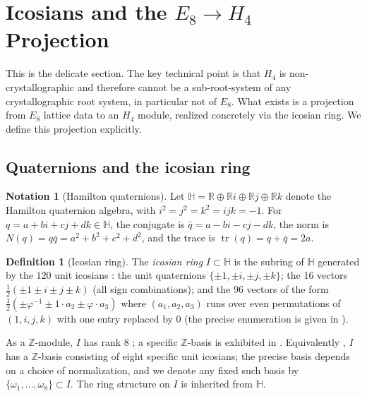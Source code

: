 \documentclass[11pt, a4paper]{amsart}
\theoremstyle{definition}
\newtheorem{definition}[theorem]{Definition}
\newtheorem{notation}[theorem]{Notation}
\newcommand{\R}{\mathbb{R}}
\newcommand{\Z}{\mathbb{Z}}
\newcommand{\HH}{\mathbb{H}}
\begin{document}
\section{Icosians and the $E_8 \to H_4$ Projection}
\label{sec:H4}

This is the delicate section. The key technical point is that
$H_4$ is non-crystallographic and therefore cannot be a
sub-root-system of any crystallographic root system, in particular
not of $E_8$. What exists is a projection from $E_8$ lattice data
to an $H_4$ module, realized concretely via the icosian ring. We
define this projection explicitly.

\subsection{Quaternions and the icosian ring}

\begin{notation}[Hamilton quaternions]
Let $\HH = \R \oplus \R i \oplus \R j \oplus \R k$ denote the
Hamilton quaternion algebra, with $i^2 = j^2 = k^2 = ijk = -1$.
For $q = a + bi + cj + dk \in \HH$, the conjugate is
$\bar q = a - bi - cj - dk$, the norm is
$N(q) = q \bar q = a^2 + b^2 + c^2 + d^2$, and the trace is
$\operatorname{tr}(q) = q + \bar q = 2a$.
\end{notation}

\begin{definition}[Icosian ring]
\label{def:icosian-ring}
The \emph{icosian ring} $I \subset \HH$ is the subring of $\HH$
generated by the $120$ unit icosians \cite[\S 8.2,
Eq.~(15)]{ConwaySloane}: the unit quaternions
$\{\pm 1, \pm i, \pm j, \pm k\}$; the $16$ vectors
$\tfrac{1}{2}(\pm 1 \pm i \pm j \pm k)$ (all sign combinations);
and the $96$ vectors of the form
$\tfrac{1}{2}(\pm \varphi^{-1} \pm 1 \cdot a_2 \pm \varphi \cdot a_3)$
where $(a_1, a_2, a_3)$ runs over even permutations of
$(1, i, j, k)$ with one entry replaced by $0$ (the precise
enumeration is given in \cite[\S 8.2.2, Table~8.1]{ConwaySloane}).

As a $\Z$-module, $I$ has rank $8$ \cite[Ch.~8,
Eq.~(17)]{ConwaySloane}; a specific $\Z$-basis is exhibited in
\cite[Table~8.1]{ConwaySloane}. Equivalently
\cite[Theorem~4.1]{MoodyPatera}, $I$ has a $\Z$-basis consisting of
eight specific unit icosians; the precise basis depends on a
choice of normalization, and we denote any fixed such basis by
$\{\omega_1, \ldots, \omega_8\} \subset I$. The ring structure on
$I$ is inherited from $\HH$.
\end{definition}
\end{document}
